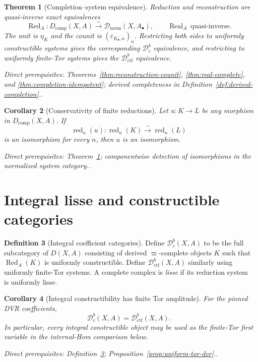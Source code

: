\documentclass[10pt]{article}
\newtheorem{theorem}{Theorem}[section]
\newtheorem{corollary}[theorem]{Corollary}
\theoremstyle{definition}
\newtheorem{definition}[theorem]{Definition}
\newcommand{\Dbc}{\mathcal D^b_c}
\newcommand{\Dctf}{\mathcal D^b_{\mathrm{ctf}}}
\newcommand{\Dnorm}{\mathcal D_{\mathrm{norm}}}
\newcommand{\depends}[1]{\par\smallskip\noindent\textit{Direct prerequisites:} #1.}
\begin{document}
\begin{theorem}[Completion--system equivalence]\label{thm:adic-equivalence}
Reduction and reconstruction are quasi-inverse exact equivalences
\[
 \operatorname{Red}_A:
 D_{\mathrm{comp}}(X,A)\xrightarrow{\sim}
 \Dnorm(X,A_\bullet),
 \qquad
 \operatorname{Real}_A\ \text{quasi-inverse}.
\]
The unit is $\eta_K$ and the counit is
$(\varepsilon_{K_\bullet,n})_n$.  Restricting both sides to uniformly
constructible systems gives the corresponding $\Dbc$ equivalence, and
restricting to uniformly finite-Tor systems gives the $\Dctf$ equivalence.
\depends{Theorems~\ref{thm:reconstruction-counit},
\ref{thm:real-complete}, and \ref{thm:completion-idempotent};
derived completeness in
Definition~\ref{def:derived-completion}.}
\end{theorem}

\begin{corollary}[Conservativity of finite reductions]
\label{cor:reduction-conservative}
Let $u:K\to L$ be any morphism in $D_{\mathrm{comp}}(X,A)$.  If
\[
 \operatorname{red}_n(u):\operatorname{red}_n(K)
       \xrightarrow{\sim}\operatorname{red}_n(L)
\]
is an isomorphism for every $n$, then $u$ is an isomorphism.
\depends{Theorem~\ref{thm:adic-equivalence}; componentwise detection of
isomorphisms in the normalized system category.}
\end{corollary}

\section{Integral lisse and constructible categories}

\begin{definition}[Integral coefficient categories]\label{def:integral-dbc}
Define $\Dbc(X,A)$ to be the full subcategory of $D(X,A)$ consisting of
derived $\varpi$-complete objects $K$ such that
$\operatorname{Red}_A(K)$ is uniformly constructible.  Define
$\Dctf(X,A)$ similarly using uniformly finite-Tor systems.  A complete
complex is \emph{lisse} if its reduction system is uniformly lisse.
\end{definition}

\begin{corollary}[Integral constructibility has finite Tor amplitude]
\label{cor:integral-dbc-dctf}
For the pinned DVR coefficients,
\[
 \Dbc(X,A)=\Dctf(X,A).
\]
In particular, every integral constructible object may be used as the
finite-Tor first variable in the internal-Hom comparison below.
\depends{Definition~\ref{def:integral-dbc};
Proposition~\ref{prop:uniform-tor-dvr}.}
\end{corollary}
\end{document}
